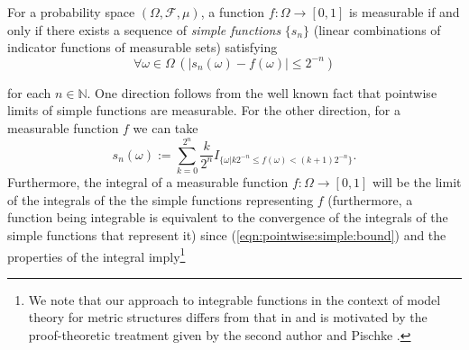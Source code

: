 \documentclass[11pt]{amsart}
\theoremstyle{definition}
\theoremstyle{remark}
\newcommand{\seq}[1]{\{{#1}\}}
\def\NN{\mathbb{N}}
\begin{document}
For a probability space $(\Omega, \mathcal{F},\mu)$, a function $f:\Omega \to [0,1]$ is measurable if and only if there exists a sequence of \emph{simple functions} $\seq{s_n}$ (linear combinations of indicator functions of measurable sets) satisfying 
\begin{equation}
\label{eqn:pointwise:simple:bound}
    \forall \omega \in \Omega\,(|s_n(\omega)-f(\omega)| \le 2^{-n})
\end{equation}

for each $n \in \NN$. One direction follows from the well known fact that pointwise limits of simple functions are measurable. For the other direction, for a measurable function $f$ we can take 
\[
s_n(\omega):= \sum_{k=0}^{2^n}\frac{k}{2^{n}}I_{\{\omega| k2^{-n}\le f(\omega)< (k+1)2^{-n}\}}.
\]
Furthermore, the integral of a measurable function $f:\Omega \to [0,1]$ will be the limit of the integrals of the the simple functions representing $f$ (furthermore, a function being integrable is equivalent to the convergence of the integrals of the simple functions that represent it) since (\ref{eqn:pointwise:simple:bound}) and the properties of the integral imply\footnote{We note that our approach to integrable functions in the context of model theory for metric structures differs from that in \cite{DI2017} and is motivated by the proof-theoretic treatment given by the second author and Pischke \cite{neri-pischke:24:formal:pub}.}
\end{document}
